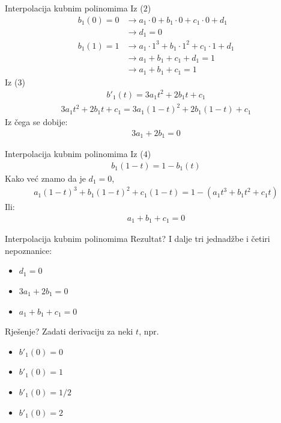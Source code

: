 \documentclass[9pt]{beamer}
\begin{document}
\begin{frame}{Interpolacija kubnim polinomima}
	Iz ($2$)
	\begin{align*}
	b_1(0)  = 0 & \rightarrow a_1\cdot 0+b_1\cdot 0 +c_1 \cdot 0 + d_1 \\
	            & \rightarrow d_1 = 0 \\
	b_1(1)  = 1 & \rightarrow a_1\cdot 1^3+b_1\cdot 1^2 +c_1 \cdot 1 + d_1 \\
	            & \rightarrow a_1 +b_1  +c_1 + d_1  = 1 \\%
	            & \rightarrow a_1 +b_1  +c_1   = 1
	\end{align*}
	Iz ($3$)
	\begin{align*}
		b'_1(t) = 3a_1t^2+2b_1 t +c_1
	\end{align*}
	\begin{align*}
		3a_1t^2+2b_1 t +c_1 = 3a_1(1-t)^2+2b_1 (1-t)+c_1
	\end{align*}
	Iz čega se dobije:
	\begin{align*}
		3a_1+2b_1 = 0
	\end{align*}
\end{frame}
\begin{frame}{Interpolacija kubnim polinomima}
	Iz ($4$)
	\begin{align*}
	b_1(1-t) = 1-b_1(t)
	\end{align*}
	Kako već znamo da je $d_1=0$,
	\begin{align*}
		a_1(1-t)^3+b_1(1-t)^2+c_1(1-t) = 1- (a_1t^3+b_1t^2+c_1t)
	\end{align*}
	Ili:
	\begin{align*}
		a_1+b_1 + c_1 = 0
	\end{align*}
\end{frame}
\begin{frame}{Interpolacija kubnim polinomima}
	Rezultat? I dalje tri jednadžbe i četiri nepoznanice:
	\begin{itemize}
		\item $d_1=0$
		\item $3a_1+2b_1 = 0$
		\item $a_1+b_1 + c_1 = 0$
	\end{itemize}
Rješenje? Zadati derivaciju za neki $t$, npr.
\begin{itemize}
	\item $b'_1(0)=0$
	\item $b'_1(0)=1$
	\item $b'_1(0)=1/2$
	\item $b'_1(0)=2$
\end{itemize}
\end{frame}
\end{document}
